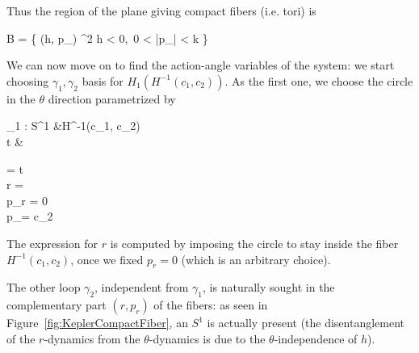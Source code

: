 \documentclass[main.tex]{subfiles}
\begin{document}
\begin{example}
	\begin{figure}[H]
		\centering
	\end{figure}

	Thus the region of the plane giving compact fibers (i.e. tori) is
	\begin{eqalign}
		B = \left\{ (h, p_\theta) \in \R^2 \suchthat h < 0,\ 0 < |p_\theta| < k  \right\}
	\end{eqalign}
	We can now move on to find the action-angle variables of the system: we start choosing $\gamma_1, \gamma_2$ basis for $H_1(H^{-1}(c_1, c_2))$. As the first one, we choose the circle in the $\theta$ direction parametrized by
	\begin{eqalign}
		\gamma_1 : S^1 &\longto H^{-1}(c_1, c_2)\\
		t &\overset{\theta}\longmapsto \begin{dcases}
			\theta = t\\
			r = \frac{-k + \sqrt{k^2 + \frac{c_1c_2^2}{m}}}{2c_1}\\
			p_r = 0\\
			p_\theta = c_2
		\end{dcases}
	\end{eqalign}
	The expression for $r$ is computed by imposing the circle to stay inside the fiber $H^{-1}(c_1, c_2)$, once we fixed $p_r=0$ (which is an arbitrary choice).

	The other loop $\gamma_2$, independent from $\gamma_1$, is naturally sought in the complementary part $(r,p_r)$
	of the fibers: as seen in Figure~\ref{fig:KeplerCompactFiber}, an $S^1$ is actually present (the disentanglement of the $r$-dynamics from the $\theta$-dynamics is due to the $\theta$-independence of $h$).


\end{example}
\end{document}
